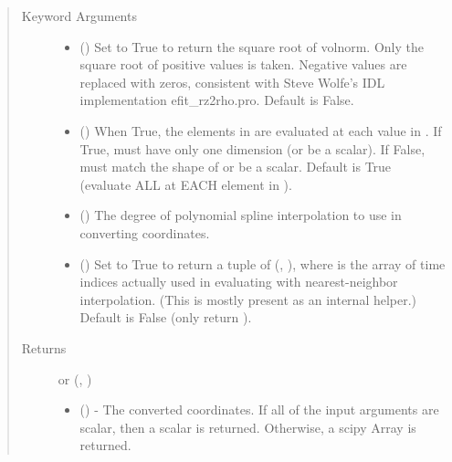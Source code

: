 \documentclass[letterpaper,10pt,english]{sphinxmanual}
\begin{document}
\begin{fulllineitems}
\begin{fulllineitems}
\begin{quote}
\begin{description}
\item[{Keyword Arguments}] \leavevmode\begin{itemize}
\item {} 
 () \textendash{} Set to True to return the square root of volnorm.
Only the square root of positive values is taken. Negative
values are replaced with zeros, consistent with Steve Wolfe’s
IDL implementation efit\_rz2rho.pro. Default is False.

\item {} 
 () \textendash{} When True, the elements in  are evaluated
at each value in . If True,  must have only one dimension
(or be a scalar). If False,  must match the shape of 
or be a scalar. Default is True (evaluate ALL  at EACH
element in ).

\item {} 
 () \textendash{} The degree of polynomial spline interpolation to
use in converting coordinates.

\item {} 
 () \textendash{} Set to True to return a tuple of (,
), where  is the array of time indices
actually used in evaluating  with nearest-neighbor
interpolation. (This is mostly present as an internal helper.)
Default is False (only return ).

\end{itemize}

\item[{Returns}] \leavevmode

 or (, )
\begin{itemize}
\item {} 
 () - The converted coordinates. If
all of the input arguments are scalar, then a scalar is returned.
Otherwise, a scipy Array is returned.


\end{itemize}
\end{description}
\end{quote}
\end{fulllineitems}
\end{fulllineitems}
\end{document}
